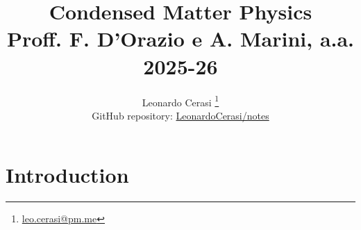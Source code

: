 \documentclass[a4paper, 12pt]{book}
\title{\Huge\textbf{Condensed Matter Physics} \\ \large Proff. F. D'Orazio e A. Marini, a.a. 2025-26}
\author{Leonardo Cerasi%
	\thanks{\scriptsize\href{mailto:leo.cerasi@pm.me}{leo.cerasi@pm.me}} \\
	\small GitHub repository: \href{https://github.com/LeonardoCerasi/notes}{LeonardoCerasi/notes}}
\date{}
\begin{document}
\frontmatter

\maketitle

\toc

\pagestyle{contents}

\mainmatter

\pagestyle{introd}
\chapter{Introduction}

\end{document}
